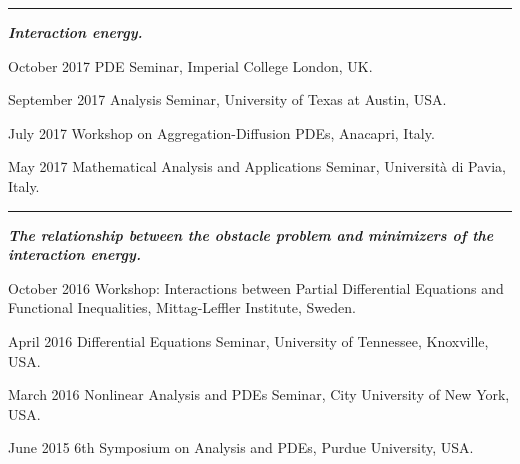 \documentclass[11pt]{article}
\newcommand{\entry}[2]{%
  \par\addvspace{0.6ex}\noindent
  \begin{list}{}{%
    \setlength{\leftmargin}{1.5in}%
    \setlength{\labelwidth}{1.4in}%
    \setlength{\labelsep}{0.1in}%
  }%
  \item[\textsf{\small #1}] #2
  \end{list}
}
\newcommand{\talkgroup}[1]{%
  \par\addvspace{1.6ex}%
  \noindent\rule[0.4ex]{0.9em}{0.6pt}\enspace\textbf{\itshape #1}%
  \par\nopagebreak\addvspace{0.4ex}%
}
\begin{document}
\talkgroup{Interaction energy.}
\entry{October 2017}{PDE Seminar, Imperial College London, UK.}
\entry{September 2017}{Analysis Seminar, University of Texas at Austin, USA.}
\entry{July 2017}{Workshop on Aggregation-Diffusion PDEs, Anacapri, Italy.}
\entry{May 2017}{Mathematical Analysis and Applications Seminar, Universit\`a di Pavia, Italy.}

\talkgroup{The relationship between the obstacle problem and minimizers of the interaction energy.}
\entry{October 2016}{Workshop: Interactions between Partial Differential Equations and Functional Inequalities, Mittag-Leffler Institute, Sweden.}
\entry{April 2016}{Differential Equations Seminar, University of Tennessee, Knoxville, USA.}
\entry{March 2016}{Nonlinear Analysis and PDEs Seminar, City University of New York, USA.}
\entry{June 2015}{6th Symposium on Analysis and PDEs, Purdue University, USA.}
\end{document}

